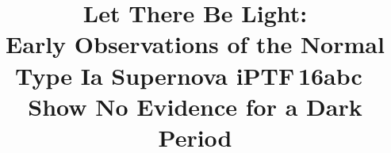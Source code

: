 \documentclass[twocolumn]{aastex61}
\newcommand{\abc}{iPTF\,16abc}
\begin{document}
\title{Let There Be Light: \\ Early Observations of the Normal Type Ia Supernova \abc\ \\Show No Evidence for a Dark Period}


\end{document}
